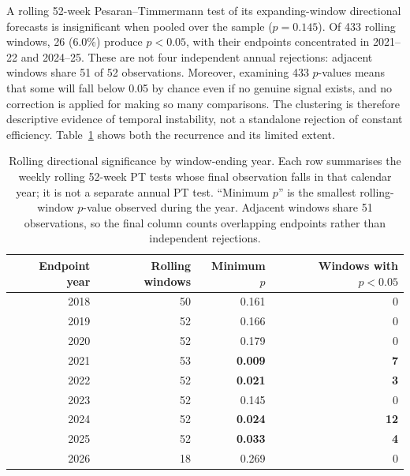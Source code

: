 \documentclass[12pt, a4paper]{article}
\begin{document}
A rolling 52-week Pesaran--Timmermann test of its expanding-window directional forecasts is
insignificant when pooled over the sample (\(p=0.145\)). Of 433 rolling windows, 26 (6.0\%)
produce \(p<0.05\), with their endpoints concentrated in 2021--22 and 2024--25. These are not
four independent annual rejections: adjacent windows share 51 of 52 observations. Moreover,
examining 433 \(p\)-values means that some will fall below 0.05 by chance even if no genuine
signal exists, and no correction is applied for making so many comparisons. The clustering is
therefore descriptive evidence of temporal instability, not a standalone rejection of constant
efficiency. Table~\ref{tab:rolling-pt-year} shows both the recurrence and its limited extent.

\begin{table}[htbp]
    \centering
    \small
    \caption{Rolling directional significance by window-ending year. Each row summarises the
    weekly rolling 52-week PT tests whose final observation falls in that calendar year; it is
    not a separate annual PT test. ``Minimum \(p\)'' is the smallest rolling-window \(p\)-value
    observed during the year. Adjacent windows share 51 observations, so the final column counts
    overlapping endpoints rather than independent rejections.}
    \label{tab:rolling-pt-year}
    \begin{tabular}{r r r r}
        \toprule
        Endpoint year & Rolling windows & Minimum \(p\) & Windows with \(p<0.05\) \\
        \midrule
        2018 & 50 & 0.161 & 0 \\
        2019 & 52 & 0.166 & 0 \\
        2020 & 52 & 0.179 & 0 \\
        2021 & 53 & \textbf{0.009} & \textbf{7} \\
        2022 & 52 & \textbf{0.021} & \textbf{3} \\
        2023 & 52 & 0.145 & 0 \\
        2024 & 52 & \textbf{0.024} & \textbf{12} \\
        2025 & 52 & \textbf{0.033} & \textbf{4} \\
        2026 & 18 & 0.269 & 0 \\
        \bottomrule
    \end{tabular}
\end{table}
\end{document}
